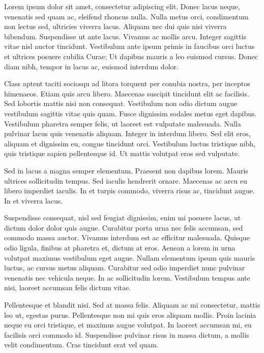 
\noindent{}Lorem ipsum dolor sit amet, consectetur adipiscing elit. Donec lacus neque, venenatis sed quam ac, eleifend rhoncus nulla. Nulla metus orci, condimentum non lectus sed, ultricies viverra lacus. Aliquam nec dui quis nisi viverra bibendum. Suspendisse ut ante lacus. Vivamus ac mollis arcu. Integer sagittis vitae nisl auctor tincidunt. Vestibulum ante ipsum primis in faucibus orci luctus et ultrices posuere cubilia Curae; Ut dapibus mauris a leo euismod cursus. Donec diam nibh, tempor in lacus ac, euismod interdum dolor.

Class aptent taciti sociosqu ad litora torquent per conubia nostra, per inceptos himenaeos. Etiam quis arcu libero. Maecenas suscipit tincidunt elit ac facilisis. Sed lobortis mattis nisi non consequat. Vestibulum non odio dictum augue vestibulum sagittis vitae quis quam. Fusce dignissim sodales metus eget dapibus. Vestibulum pharetra semper felis, ut laoreet est vulputate malesuada. Nulla pulvinar lacus quis venenatis aliquam. Integer in interdum libero. Sed elit eros, aliquam et dignissim eu, congue tincidunt orci. Vestibulum luctus tristique nibh, quis tristique sapien pellentesque id. Ut mattis volutpat eros sed vulputate.

Sed in lacus a magna semper elementum. Praesent non dapibus lorem. Mauris ultrices sollicitudin tempus. Sed iaculis hendrerit ornare. Maecenas ac arcu eu libero imperdiet iaculis. In et turpis commodo, viverra risus ac, tincidunt augue. In et viverra lacus.

Suspendisse consequat, nisl sed feugiat dignissim, enim mi posuere lacus, ut dictum dolor dolor quis augue. Curabitur porta urna nec felis accumsan, sed commodo massa auctor. Vivamus interdum est ac efficitur malesuada. Quisque odio ligula, finibus at pharetra et, dictum at eros. Aenean a lorem in urna volutpat maximus vestibulum eget augue. Nullam elementum ipsum quis mauris luctus, ac cursus metus aliquam. Curabitur sed odio imperdiet nunc pulvinar venenatis nec vehicula neque. In ac sollicitudin lorem. Vestibulum tempus ante nisi, laoreet accumsan felis dictum vitae.

Pellentesque et blandit nisi. Sed at massa felis. Aliquam ac mi consectetur, mattis leo ut, egestas purus. Pellentesque non mi quis eros aliquam mollis. Proin lacinia neque eu orci tristique, et maximus augue volutpat. In laoreet accumsan mi, eu facilisis orci commodo id. Suspendisse pulvinar risus in massa dictum, a mollis velit condimentum. Cras tincidunt erat vel quam.